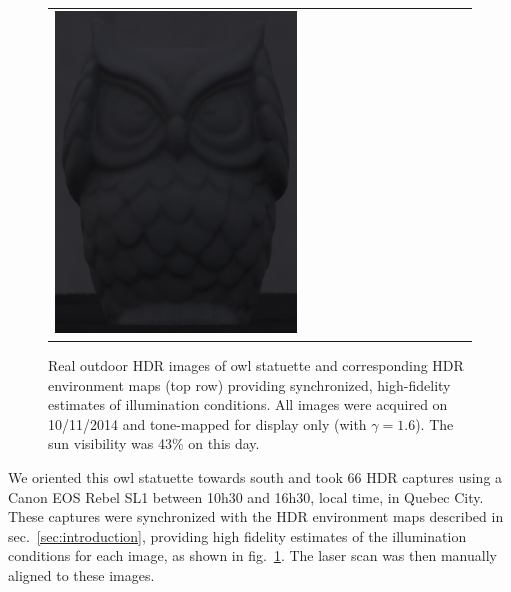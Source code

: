 \begin{figure}[!ht]
\begin{tabular}{@{}rcccccccccccc@{}}
    \includegraphics[width=\customwidth]{./figures/reconstruction/object/160215.jpg}

    \end{tabular}
    \caption{Real outdoor HDR images of owl statuette and corresponding HDR environment maps (top row) providing synchronized, high-fidelity estimates of illumination conditions. All images were acquired on 10/11/2014 and tone-mapped for display only (with $\gamma = 1.6$). The sun visibility was 43\% on this day. }
    \label{fig:reconstruction:example_envmaps}
    \vspace{-1em}
\end{figure}

We oriented this owl statuette towards south and took 66 HDR captures using a Canon EOS Rebel SL1 between 10h30 and 16h30, local time, in Quebec City. These captures were synchronized with the HDR environment maps described in sec.~\ref{sec:introduction}, providing high fidelity estimates of the illumination conditions for each image, as shown in fig.~\ref{fig:reconstruction:example_envmaps}. The laser scan was then manually aligned to these images.

